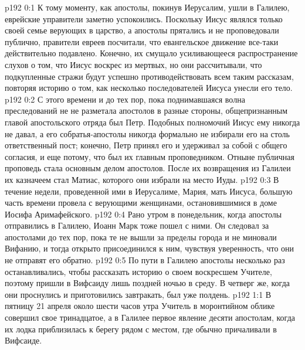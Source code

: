 \author{Комиссия срединников}
\vs p192 0:1 К тому моменту, как апостолы, покинув Иерусалим, ушли в Галилею, еврейские управители заметно успокоились. Поскольку Иисус являлся только своей семье верующих в царство, а апостолы прятались и не проповедовали публично, правители евреев посчитали, что евангельское движение все\hyp{}таки действительно подавлено. Конечно, их смущало усиливающееся распространение слухов о том, что Иисус воскрес из мертвых, но они рассчитывали, что подкупленные стражи будут успешно противодействовать всем таким рассказам, повторяя историю о том, как несколько последователей Иисуса унесли его тело.
\vs p192 0:2 С этого времени и до тех пор, пока поднимавшаяся волна преследований не не разметала апостолов в разные стороны, общепризнанным главой апостольского отряда был Петр. Подобных полномочий Иисус ему никогда не давал, а его собратья\hyp{}апостолы никогда формально не избирали его на столь ответственный пост; конечно, Петр принял его и удерживал за собой с общего согласия, и еще потому, что был их главным проповедником. Отныне публичная проповедь стала основным делом апостолов. После их возвращения из Галилеи их казначеем стал Матиас, которого они избрали на место Иуды.
\vs p192 0:3 В течение недели, проведенной ими в Иерусалиме, Мария, мать Иисуса, большую часть времени провела с верующими женщинами, остановившимися в доме Иосифа Аримафейского.
\vs p192 0:4 Рано утром в понедельник, когда апостолы отправились в Галилею, Иоанн Марк тоже пошел с ними. Он следовал за апостолами до тех пор, пока те не вышли за пределы города и не миновали Вифанию, и тогда открыто присоединился к ним, чувствуя уверенность, что они не отправят его обратно.
\vs p192 0:5 По пути в Галилею апостолы несколько раз останавливались, чтобы рассказать историю о своем воскресшем Учителе, поэтому пришли в Вифсаиду лишь поздней ночью в среду. В четверг же, когда они проснулись и приготовились завтракать, был уже полдень.
\vs p192 1:1 В пятницу 21 апреля около шести часов утра Учитель в моронтийном облике совершил свое тринадцатое, а в Галилее первое явление десяти апостолам, когда их лодка приблизилась к берегу рядом с местом, где обычно причаливали в Вифсаиде.
